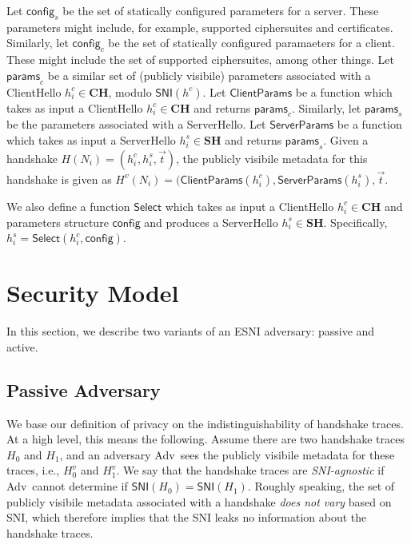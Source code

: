 \documentclass{article}
\newcommand{\adv}{{\sf Adv}}
\begin{document}
Let $\mathsf{config}_s$ be the set of statically configured parameters for a server. These parameters
might include, for example, supported ciphersuites and certificates. Similarly, let $\mathsf{config}_c$
be the set of statically configured paramaeters for a client. These might include the set of supported
ciphersuites, among other things. Let $\mathsf{params}_c$ be a
similar set of (publicly visibile) parameters associated with a ClientHello $h^c_i \in \mathbf{CH}$, modulo
$\mathsf{SNI}(h^c)$. Let $\mathsf{ClientParams}$ be a function which takes as input a ClientHello 
$h^c_i \in \mathbf{CH}$ and returns $\mathsf{params}_c$. Similarly, let $\mathsf{params}_s$ be the
parameters associated with a ServerHello. Let $\mathsf{ServerParams}$ be a function which takes as 
input a ServerHello $h^s_i \in \mathbf{SH}$ and returns $\mathsf{params}_s$. Given a handshake 
$H(N_i) = (h^c_i, h^s_i, \vec{t})$, the publicly visibile metadata for this handshake is given as 
$H^v(N_i) = (\mathsf{ClientParams}(h^c_i), \mathsf{ServerParams}(h^s_i), \vec{t}$.

We also define a function $\mathsf{Select}$ which takes as input a ClientHello $h^c_i \in \mathbf{CH}$ and
parameters structure $\mathsf{config}$ and produces a ServerHello $h^s_i \in \mathbf{SH}$. Specifically,
$h^s_i = \mathsf{Select}(h^c_i, \mathsf{config})$.

\section{Security Model}

In this section, we describe two variants of an ESNI adversary: passive and active.

\subsection{Passive Adversary}

We base our definition of privacy on the indistinguishability of handshake traces. At a high level, 
this means the following. Assume there are two handshake traces $H_0$ and $H_1$, and an adversary \adv\
sees the publicly visibile metadata for these traces, i.e., $H_0^v$ and $H_1^v$. We say that the 
handshake traces are \emph{SNI-agnostic} if \adv\ cannot determine if $\mathsf{SNI}(H_0) = \mathsf{SNI}(H_1)$.
Roughly speaking, the set of publicly visibile metadata associated with a handshake \emph{does not vary}
based on SNI, which therefore implies that the SNI leaks no information about the handshake traces.
\end{document}
